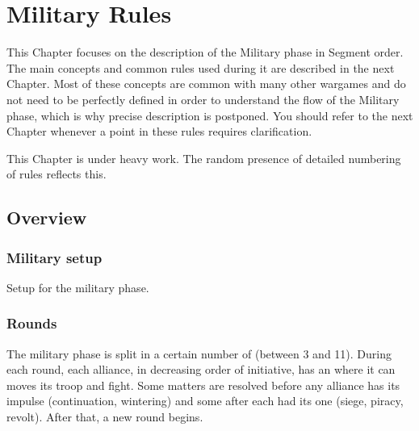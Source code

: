 

\newcommand{\iamhere}{\begin{todo} The following is copy of older stuff and de
    facto cease to be relevant before I reread and rewrite it.
\end{todo}}

\chapter{Military Rules}\label{chapter:MilitaryRules}

\begin{designnote}
  This Chapter focuses on the description of the Military phase in Segment
  order. The main concepts and common rules used during it are described in
  the next Chapter. Most of these concepts are common with many other wargames
  and do not need to be perfectly defined in order to understand the flow of
  the Military phase, which is why precise description is postponed. You
  should refer to the next Chapter whenever a point in these rules requires
  clarification.
\end{designnote}

\begin{todo}
  This Chapter is under heavy work. The random presence of detailed numbering
  of rules reflects this.
\end{todo}

\section{Overview}
\aparag[Sequence]
\MilitaryDetailsNew

\subsection{Military setup}
Setup for the military phase.

\subsection{Rounds}
The military phase is split in a certain number of  (between 3
and 11). During each round, each alliance, in decreasing order of initiative,
has an  where it can moves its troop and fight. Some matters
are resolved before any alliance has its impulse (continuation, wintering) and
some after each had its one (siege, piracy, revolt). After that, a new round
begins.

